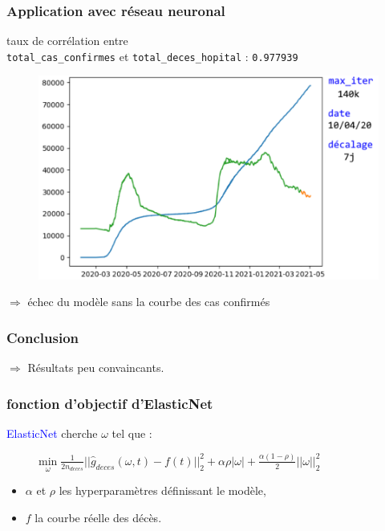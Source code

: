 \documentclass{beamer}[aspectratio = 43]
\begin{document}
\begin{frame}
	\frametitle{Application avec réseau neuronal}
	taux de corrélation entre\\ \texttt{total\_cas\_confirmes} et \texttt{total\_deces\_hopital} : \texttt{0.977939} 
	\begin{figure}
		\includegraphics[scale=0.4]{NN_up_}
	\end{figure}
	$\Rightarrow$ échec du modèle sans la courbe des cas confirmés
\end{frame}

\begin{frame}
	\frametitle{Conclusion}
$\Rightarrow$ Résultats peu convaincants.
\end{frame}

\appendix

\begin{frame}
	\frametitle{fonction d'objectif d'ElasticNet}
	\textcolor{blue}{ElasticNet} cherche $\omega$ tel que :
	\begin{figure}[h]
		$\underset{\omega}{\mathrm{min}} \; \frac{1}{2n_{deces}}||\hat{g}_{deces} (\omega,t) - f(t)||^{2}_{2} + \alpha \rho |\omega| + \frac{\alpha (1-\rho)}{2}||\omega||^{2}_{2}$
		\\
	\end{figure}
	\begin{itemize}
		\item[]$\alpha$ et $\rho$ les hyperparamètres définissant le modèle,\\
		\item[]$f$ la courbe réelle des décès.
	\end{itemize}
\end{frame}
\end{document}
